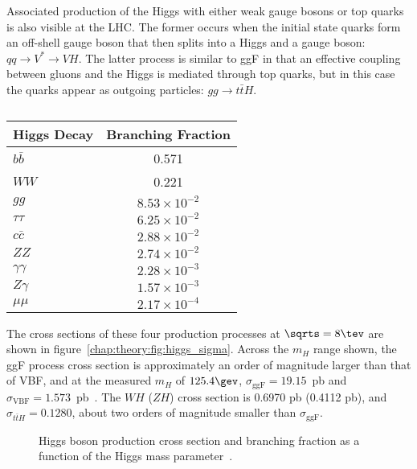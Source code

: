 Associated production of the Higgs with either weak gauge bosons or
top quarks is also visible at the LHC. The former occurs when the initial state quarks form an
off-shell gauge boson that then splits into a Higgs and a gauge boson:
$qq\rightarrow{V^{\ast}\rightarrow{VH}}$. The latter process is
similar to ggF in that an effective coupling between gluons and the
Higgs is mediated through top quarks, but in this case the quarks
appear as outgoing particles: $gg\rightarrow{t\bar{t}H}$. 

\begin{table}
\begin{center}
\renewcommand{\arraystretch}{1.2}
    \begin{tabular}{ l | c }
    \hline
    Higgs Decay & Branching Fraction \\
    \hline \hline
    $b\bar{b}$ & 0.571 \\
    $WW$ &  0.221 \\
    $gg$ &  $8.53 \times 10^{-2}$ \\
    $\tau\tau$ & $6.25 \times 10^{-2}$ \\
    $c\bar{c}$ &  $2.88 \times 10^{-2}$ \\
    $ZZ$ &  $2.74 \times 10^{-2}$ \\
    $\gamma\gamma$ &  $2.28 \times 10^{-3}$ \\
    $Z\gamma$ &  $1.57 \times 10^{-3}$ \\
    $\mu\mu$ &  $2.17 \times 10^{-4}$ \\
    \hline
    \end{tabular}
\caption[]{\cite{bib:CERNYellowReportPageBR3}}
\label{chap:theory:tab:higgs_br}
\end{center}
\end{table}

The cross sections of these four production processes at $\sqrts =
8 \tev$ are shown in
figure~\ref{chap:theory:fig:higgs_sigma}\cite{bib:Dittmaier:2011ti}. Across
the $m_H$ range shown, the ggF process cross section is approximately
an order of magnitude larger than that of VBF, and at the measured
$m_H$ of $125.4 \gev$, $\sigma_{\textrm{ggF}} = 19.15$~pb and
$\sigma_{\textrm{VBF}} =
1.573$~pb~\cite{bib:CERNYellowReportPageAt8TeV}. The $WH$ ($ZH$) cross
section is 0.6970 pb (0.4112 pb), and $\sigma_{t\bar{t}H} = 0.1280$,
about two orders of magnitude smaller than $\sigma_{\textrm{ggF}}$. 

\begin{figure}[h]
    \centering
    \caption[Higgs boson production cross section and branching
      fraction as a function of the Higgs mass parameter.]{Higgs boson
    production cross section and branching
      fraction as a function of the Higgs mass parameter~\cite{bib:Dittmaier:2011ti}.}
\label{chap:theory:fig:higgs_sigma_bf}
\end{figure}


